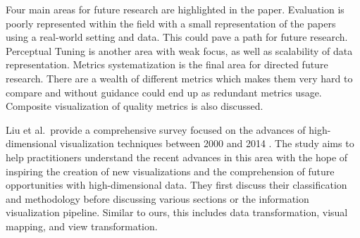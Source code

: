 %
%

Four main areas for future research are highlighted in the paper. Evaluation is poorly represented within the field with a small representation of the papers using a real-world setting and data. This could pave a path for future research. Perceptual Tuning is another area with weak focus, as well as scalability of data representation. Metrics systematization is the final area for directed future research. There are a wealth of different metrics which makes them very hard to compare and without guidance could end up as redundant metrics usage. Composite visualization of quality metrics is also discussed.

Liu et al.\ provide a comprehensive survey focused on the advances of high-dimensional visualization techniques between 2000 and 2014 \cite{liu2015visualising}. The study aims to help practitioners understand the recent advances in this area with the hope of inspiring the creation of new visualizations and the comprehension of future opportunities with high-dimensional data.
They first discuss their classification and methodology before discussing various sections or the information visualization pipeline. Similar to ours, this includes data transformation, visual mapping, and view transformation.

